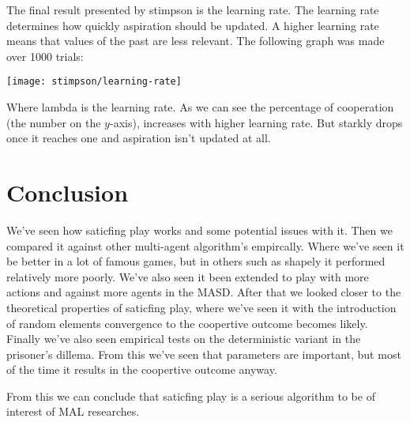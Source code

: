The final result presented by stimpson is the learning rate. The learning
rate determines how quickly aspiration should be updated. A higher learning
rate means that values of the past are less relevant. The following graph
was made over 1000 trials:

\noindent
\texttt{[image: stimpson/learning-rate]}

Where lambda is the learning rate. As we can see the percentage of cooperation
(the number on the $y$-axis), increases with higher learning rate. But starkly
drops once it reaches one and aspiration isn't updated at all.

\section{Conclusion}
\toReview

We've seen how saticfing play works and some potential issues with it.
Then we compared it against other multi-agent
algorithm's empircally. Where we've
seen it be better in a lot of famous games, but in others such as shapely it
performed relatively more poorly. We've also seen it been extended to play
with more actions and against more agents in the MASD.
After that we looked closer to the theoretical properties
of saticfing play, where we've seen it with the introduction of random elements
convergence to the coopertive outcome becomes likely.
Finally we've also seen empirical tests
on the deterministic variant in the prisoner's dillema. From this we've seen
that parameters are important, but most of the time it results in the coopertive
outcome anyway.

From this we can conclude that saticfing play is a serious algorithm to be of
interest of MAL researches.



\address{Jappie Klooster\\
  Dept. of Informatics\\
  Universiteit Utrecht\\
  The Netherlands\\}

